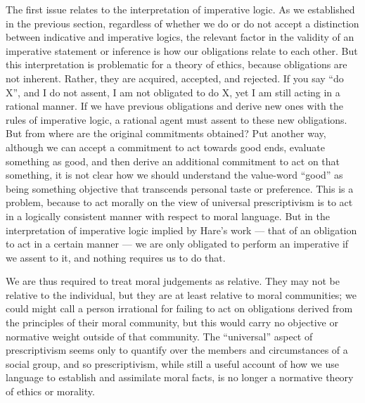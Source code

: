 \documentclass[12pt]{article}
\begin{document}
The first issue relates to the interpretation of imperative logic. As we established in the previous section, regardless of whether we do or do not accept a distinction between indicative and imperative logics, the relevant factor in the validity of an imperative statement or inference is how our obligations relate to each other. But this interpretation is problematic for a theory of ethics, because obligations are not inherent. Rather, they are acquired, accepted, and rejected. If you say ``do X'', and I do not assent, I am not obligated to do X, yet I am still acting in a rational manner. If we have previous obligations and derive new ones with the rules of imperative logic, a rational agent must assent to these new obligations. But from where are the original commitments obtained? Put another way, although we can accept a commitment to act towards good ends, evaluate something as good, and then derive an additional commitment to act on that something, it is not clear how we should understand the value-word ``good'' as being something objective that transcends personal taste or preference. This is a problem, because to act morally on the view of universal prescriptivism is to act in a logically consistent manner with respect to moral language. But in the interpretation of imperative logic implied by Hare's work --- that of an obligation to act in a certain manner --- we are only obligated to perform an imperative if we assent to it, and nothing requires us to do that.

We are thus required to treat moral judgements as relative. They may not be relative to the individual, but they are at least relative to moral communities; we could might call a person irrational for failing to act on obligations derived from the principles of their moral community, but this would carry no objective or normative weight outside of that community. The ``universal'' aspect of prescriptivism seems only to quantify over the members and circumstances of a social group, and so prescriptivism, while still a useful account of how we use language to establish and assimilate moral facts, is no longer a normative theory of ethics or morality.
\end{document}
